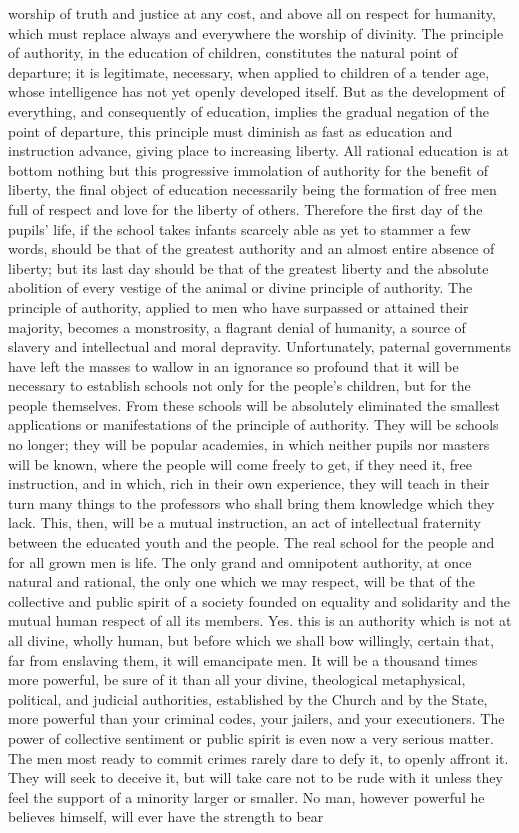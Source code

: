 \documentclass[12pt]{report}
\begin{document}
worship of truth and justice at any cost, and above all on respect for humanity, which must replace always and everywhere the worship of divinity. The principle of authority, in the education of children, constitutes the natural point of departure; it is legitimate, necessary, when applied to children of a tender age, whose intelligence has not yet openly developed itself. But as the development of everything, and consequently of education, implies the gradual negation of the point of departure, this principle must diminish as fast as education and instruction advance, giving place to increasing liberty. All rational education is at bottom nothing but this progressive immolation of authority for the benefit of liberty, the final object of education necessarily being the formation of free men full of respect and love for the liberty of others. Therefore the first day of the pupils’ life, if the school takes infants scarcely able as yet to stammer a few words, should be that of the greatest authority and an almost entire absence of liberty; but its last day should be that of the greatest liberty and the absolute abolition of every vestige of the animal or divine principle of authority. The principle of authority, applied to men who have surpassed or attained their majority, becomes a monstrosity, a flagrant denial of humanity, a source of slavery and intellectual and moral depravity. Unfortunately, paternal governments have left the masses to wallow in an ignorance so profound that it will be necessary to establish schools not only for the people’s children, but for the people themselves. From these schools will be absolutely eliminated the smallest applications or manifestations of the principle of authority. They will be schools no longer; they will be popular academies, in which neither pupils nor masters will be known, where the people will come freely to get, if they need it, free instruction, and in which, rich in their own experience, they will teach in their turn many things to the professors who shall bring them knowledge which they lack. This, then, will be a mutual instruction, an act of intellectual fraternity between the educated youth and the people. The real school for the people and for all grown men is life. The only grand and omnipotent authority, at once natural and rational, the only one which we may respect, will be that of the collective and public spirit of a society founded on equality and solidarity and the mutual human respect of all its members. Yes. this is an authority which is not at all divine, wholly human, but before which we shall bow willingly, certain that, far from enslaving them, it will emancipate men. It will be a thousand times more powerful, be sure of it than all your divine, theological metaphysical, political, and judicial authorities, established by the Church and by the State, more powerful than your criminal codes, your jailers, and your executioners. The power of collective sentiment or public spirit is even now a very serious matter. The men most ready to commit crimes rarely dare to defy it, to openly affront it. They will seek to deceive it, but will take care not to be rude with it unless they feel the support of a minority larger or smaller. No man, however powerful he believes himself, will ever have the strength to bear 
\end{document}
